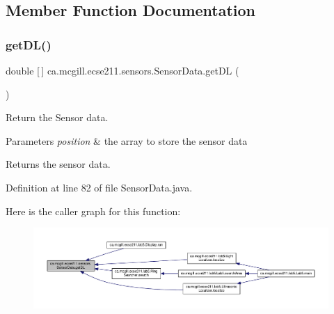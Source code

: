 \subsection{Member Function Documentation}
\mbox{\label{classca_1_1mcgill_1_1ecse211_1_1sensors_1_1_sensor_data_a4e0eabd547726c90bd0b7252557d7ad7}} 
\subsubsection{\texorpdfstring{get\+D\+L()}{getDL()}}
{\footnotesize\ttfamily double \mbox{[}$\,$\mbox{]} ca.\+mcgill.\+ecse211.\+sensors.\+Sensor\+Data.\+get\+DL (\begin{DoxyParamCaption}{ }\end{DoxyParamCaption})}

Return the Sensor data.


\begin{DoxyParams}{Parameters}
{\em position} & the array to store the sensor data \\
\hline
\end{DoxyParams}
\begin{DoxyReturn}{Returns}
the sensor data. 
\end{DoxyReturn}


Definition at line 82 of file Sensor\+Data.\+java.

Here is the caller graph for this function\+:
\nopagebreak
\begin{figure}[H]
\begin{center}
\leavevmode
\includegraphics[width=350pt]{classca_1_1mcgill_1_1ecse211_1_1sensors_1_1_sensor_data_a4e0eabd547726c90bd0b7252557d7ad7_icgraph}
\end{center}
\end{figure}
\mbox{\label{classca_1_1mcgill_1_1ecse211_1_1sensors_1_1_sensor_data_a0abd08431dae67c7ee0e7a18b5305f91}} 
